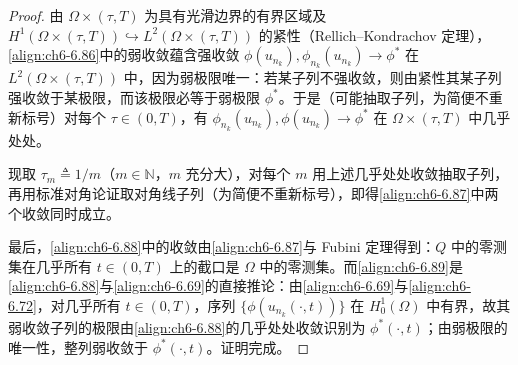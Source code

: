 \documentclass[../../main.tex]{subfiles}%
\begin{document}
\begin{proof}
由 $\Omega\times(\tau,T)$ 为具有光滑边界的有界区域及 $H^1(\Omega\times(\tau,T))\hookrightarrow L^2(\Omega\times(\tau,T))$ 的紧性（Rellich--Kondrachov 定理），\eqref{align:ch6-6.86}中的弱收敛蕴含强收敛 $\phi(u_{n_k}),\phi_{n_k}(u_{n_k})\to\phi^*$ 在 $L^2(\Omega\times(\tau,T))$ 中，因为弱极限唯一：若某子列不强收敛，则由紧性其某子列强收敛于某极限，而该极限必等于弱极限 $\phi^*$。于是（可能抽取子列，为简便不重新标号）对每个 $\tau\in(0,T)$，有 $\phi_{n_k}(u_{n_k}),\phi(u_{n_k})\to\phi^*$ 在 $\Omega\times(\tau,T)$ 中几乎处处。

现取 $\tau_m\triangleq1/m$（$m\in\mathbb{N}$，$m$ 充分大），对每个 $m$ 用上述几乎处处收敛抽取子列，再用标准对角论证取对角线子列（为简便不重新标号），即得\eqref{align:ch6-6.87}中两个收敛同时成立。

最后，\eqref{align:ch6-6.88}中的收敛由\eqref{align:ch6-6.87}与 Fubini 定理得到：$Q$ 中的零测集在几乎所有 $t\in(0,T)$ 上的截口是 $\Omega$ 中的零测集。而\eqref{align:ch6-6.89}是\eqref{align:ch6-6.88}与\eqref{align:ch6-6.69}的直接推论：由\eqref{align:ch6-6.69}与\eqref{align:ch6-6.72}，对几乎所有 $t\in(0,T)$，序列 $\{\phi(u_{n_k}(\cdot,t))\}$ 在 $H^1_0(\Omega)$ 中有界，故其弱收敛子列的极限由\eqref{align:ch6-6.88}的几乎处处收敛识别为 $\phi^*(\cdot,t)$；由弱极限的唯一性，整列弱收敛于 $\phi^*(\cdot,t)$。证明完成。
\end{proof}

\end{document}
